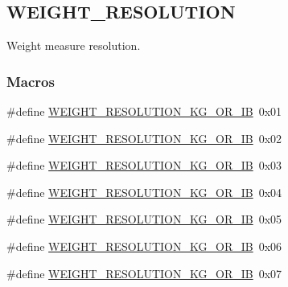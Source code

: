 \hypertarget{group___w_e_i_g_h_t___r_e_s_o_l_u_t_i_o_n}{}\subsection{W\+E\+I\+G\+H\+T\+\_\+\+R\+E\+S\+O\+L\+U\+T\+I\+ON}
\label{group___w_e_i_g_h_t___r_e_s_o_l_u_t_i_o_n}


Weight measure resolution.  


\subsubsection*{Macros}
\begin{DoxyCompactItemize}
\item 
\#define \hyperlink{group___w_e_i_g_h_t___r_e_s_o_l_u_t_i_o_n_ga63d9be1859b02e0d16474c1f2a5130aa}{W\+E\+I\+G\+H\+T\+\_\+\+R\+E\+S\+O\+L\+U\+T\+I\+O\+N\+\_\+K\+G\+\_\+\+O\+R\+\_\+IB}~0x01
\item 
\#define \hyperlink{group___w_e_i_g_h_t___r_e_s_o_l_u_t_i_o_n_gab1d34bc476381d733906e8188c7f6cd6}{W\+E\+I\+G\+H\+T\+\_\+\+R\+E\+S\+O\+L\+U\+T\+I\+O\+N\+\_\+K\+G\+\_\+\+O\+R\+\_\+IB}~0x02
\item 
\#define \hyperlink{group___w_e_i_g_h_t___r_e_s_o_l_u_t_i_o_n_ga0fabd4101e2f50385ae46288cd5ecf38}{W\+E\+I\+G\+H\+T\+\_\+\+R\+E\+S\+O\+L\+U\+T\+I\+O\+N\+\_\+K\+G\+\_\+\+O\+R\+\_\+IB}~0x03
\item 
\#define \hyperlink{group___w_e_i_g_h_t___r_e_s_o_l_u_t_i_o_n_gadcd7e273e25712667186f9426e1c616c}{W\+E\+I\+G\+H\+T\+\_\+\+R\+E\+S\+O\+L\+U\+T\+I\+O\+N\+\_\+K\+G\+\_\+\+O\+R\+\_\+IB}~0x04
\item 
\#define \hyperlink{group___w_e_i_g_h_t___r_e_s_o_l_u_t_i_o_n_ga8b94c3abcdc773a8e9b5faa5ec62b88e}{W\+E\+I\+G\+H\+T\+\_\+\+R\+E\+S\+O\+L\+U\+T\+I\+O\+N\+\_\+K\+G\+\_\+\+O\+R\+\_\+IB}~0x05
\item 
\#define \hyperlink{group___w_e_i_g_h_t___r_e_s_o_l_u_t_i_o_n_gad26ab1508d147021257a705a435c0b4d}{W\+E\+I\+G\+H\+T\+\_\+\+R\+E\+S\+O\+L\+U\+T\+I\+O\+N\+\_\+K\+G\+\_\+\+O\+R\+\_\+IB}~0x06
\item 
\#define \hyperlink{group___w_e_i_g_h_t___r_e_s_o_l_u_t_i_o_n_ga0377a151edaf866a54925dec82006fdc}{W\+E\+I\+G\+H\+T\+\_\+\+R\+E\+S\+O\+L\+U\+T\+I\+O\+N\+\_\+K\+G\+\_\+\+O\+R\+\_\+IB}~0x07
\end{DoxyCompactItemize}


